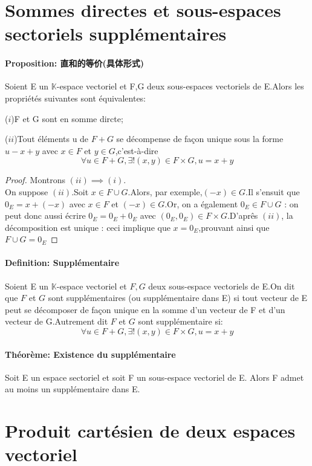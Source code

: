 \documentclass[12pt]{book}
\theoremstyle{definition}\newtheorem{dfn}{Définition}[chapter]
\theoremstyle{plain}\newtheorem{thm}{Théorème}[chapter]
\theoremstyle{plain}\newtheorem{prp}{Proposition}[chapter]
\theoremstyle{plain}\newtheorem{lem}{\bf Lemme}[chapter]
\theoremstyle{plain}\newtheorem{axm}{\bf Axiome}[chapter]
\theoremstyle{plain}\newtheorem{lmm}{\bf Lemme}[chapter]
\theoremstyle{plain}\newtheorem{cor}{\bf Corollaire}[chapter]
\theoremstyle{remark}\newtheorem{rem}{Remarque}[chapter]
\begin{document}
\section{Sommes directes et sous-espaces sectoriels supplémentaires}

\paragraph{Proposition: 直和的等价(具体形式)}
Soient E un $\mathbb{K}$-espace vectoriel et F,G deux sous-espaces vectoriels de E.Alors les propriétés suivantes sont équivalentes:

($i$)F et G sont en somme dircte;

($ii$)Tout éléments u de $F+G$ se décompense de façon unique sous la forme $u-x+y$ avec $x\in F$ et $y\in G$,c'est-à-dire $$\forall u\in F+G, \exists!(x,y)\in F\times G, u=x+y$$
\begin{proof}
        Montrons $(ii)\implies(i)$.
\\
On suppose $(ii)$.Soit $x\in F\cup G$.Alors, par exemple,$(-x)\in G$.Il s'ensuit que $0_E=x+(-x)$ avec $x\in F$ et $(-x)\in G$.Or, on a également $0_E\in F\cup G$ : on peut donc aussi écrire $0_E=0_E+0_E$ avec $(0_E,0_E)\in F\times G$.D'aprês $(ii)$, la décomposition est unique :
ceci implique que $x=0_E$,prouvant ainsi que $F\cup G={0_E}$
\end{proof}
\paragraph{Definition: Supplémentaire}
Soient E un $\mathbb{K}$-espace vectoriel et $F,G$ deux sous-espace vectoriels de E.On dit que $F$ et $G$ sont supplémentaires (ou supplémentaire dans E) si tout vecteur de E peut se décomposer de façon unique en la somme d'un vecteur de F et d'un vecteur de G.Autrement dit $F$ et $G$ sont supplémentaire si:
$$
\forall u\in F+G, \exists!(x,y)\in F\times G, u=x+y
$$

\paragraph{Théorème: Existence du supplémentaire}
Soit E un espace sectoriel et soit F un sous-espace vectoriel de E. Alors F admet au moins un supplémentaire dans E.

\section{Produit cartésien de deux espaces vectoriel}
\end{document}
